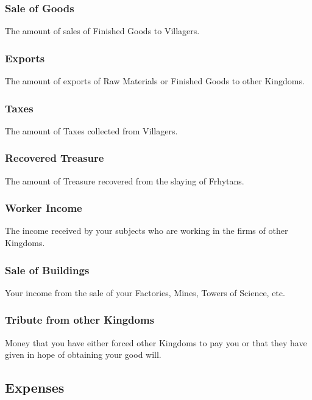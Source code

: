 

\subsubsection{Sale of Goods}

The amount of sales of Finished Goods to Villagers.

\subsubsection{Exports}

The amount of exports of Raw Materials or Finished Goods to other Kingdoms.

\subsubsection{Taxes}

The amount of Taxes collected from Villagers.

\subsubsection{Recovered Treasure}

The amount of Treasure recovered from the slaying of Frhytans.

\subsubsection{Worker Income}

The income received by your subjects who are working in the firms of other Kingdoms.

\subsubsection{Sale of Buildings}

Your income from the sale of your Factories, Mines, Towers of Science, etc.

\subsubsection{Tribute from other Kingdoms}

Money that you have either forced other Kingdoms to pay you or that they have given in hope of obtaining your good will.

\subsection{Expenses}

